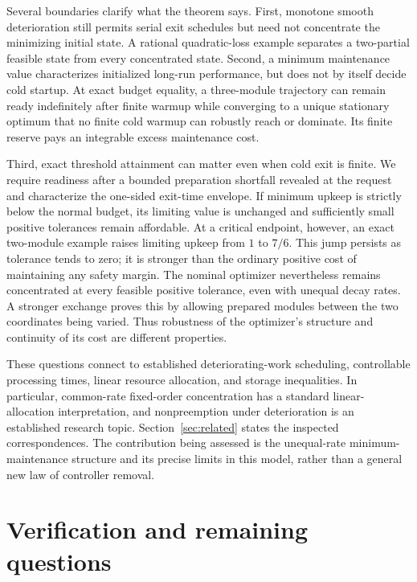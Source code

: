 \documentclass[11pt]{article}
\theoremstyle{remark}
\begin{document}
Several boundaries clarify what the theorem says. First, monotone smooth
deterioration still permits serial exit schedules but need not concentrate
the minimizing initial state. A rational quadratic-loss example separates a
two-partial feasible state from every concentrated state. Second, a minimum
maintenance value characterizes initialized long-run performance, but does
not by itself decide cold startup. At exact budget equality, a three-module
trajectory can remain ready indefinitely after finite warmup while converging
to a unique stationary optimum that no finite cold warmup can robustly reach or
dominate. Its finite reserve pays an integrable excess maintenance cost.

Third, exact threshold attainment can matter even when cold exit is finite.
We require readiness after a bounded preparation shortfall revealed at the
request and characterize the one-sided exit-time envelope. If minimum upkeep
is strictly below the normal budget, its limiting value is unchanged and
sufficiently small positive tolerances remain affordable. At a critical
endpoint, however, an exact two-module example raises limiting upkeep from
$1$ to $7/6$. This jump persists as tolerance tends to zero; it is stronger
than the ordinary positive cost of maintaining any safety margin.
The nominal optimizer nevertheless remains concentrated at every feasible
positive tolerance, even with unequal decay rates. A stronger exchange proves
this by allowing prepared modules between the two coordinates being varied.
Thus robustness of the optimizer's structure and continuity of its cost are
different properties.

These questions connect to established deteriorating-work scheduling,
controllable processing times, linear resource allocation, and storage
inequalities. In particular, common-rate fixed-order concentration has a
standard linear-allocation interpretation, and nonpreemption under
deterioration is an established research topic. Section~\ref{sec:related}
states the inspected correspondences. The contribution being assessed is the
unequal-rate minimum-maintenance structure and its precise limits in this
model, rather than a general new law of controller removal.






\section{Verification and remaining questions}
\end{document}

